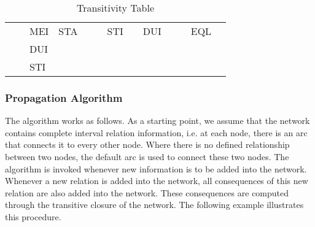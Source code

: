 \documentclass[11pt]{report}
\newenvironment{vvarmargin}[2]
{
  \begin{list}{}
  {
    \setlength{\topsep}{0pt}
    \setlength{\leftmargin}{0pt}
    \setlength{\rightmargin}{0pt}
    \setlength{\listparindent}{\parindent}
    \setlength{\itemindent}{\parindent}
    \setlength{\parsep}{0pt plus 1pt}
    \addtolength{\leftmargin}{#1}\addtolength{\rightmargin}{#2}
  }
  \item
}
{
  \end{list}
}
\begin{document}
\begin{table}[p]
\begin{vvarmargin}{-4cm}{-4cm}
\begin{center}
\begin{tabular}[t]{|r|l|l|l|l|l|l|l|l|l|l|l|l|}
                                        &                         & MEI                     & STA                     &                         &                         & STI                     &                         & DUI                     &                         &                         & EQL                     &                         \\
                                        &                         & DUI                     &                         &                         &                         &                         &                         &                         &                         &                         &                         &                         \\
                                        &                         & STI                     &                         &                         &                         &                         &                         &                         &                         &                         &                         &                         \\
                \hline
              \end{tabular}
            \end{center}
            \caption[]{Transitivity Table}
            \label{table-trans}
          \end{vvarmargin}
        \end{table}

        \subsubsection{Propagation Algorithm}

          The algorithm works as follows. As a starting point, we assume that the
          network contains complete interval relation information, i.e. at each node,
          there is an arc that connects it to every other node. Where there is no
          defined relationship between two nodes, the default arc is used to connect
          these two nodes. The algorithm is invoked whenever new information is to be
          added into the network. Whenever a new relation is added into the network,
          all consequences of this new relation are also added into the network. These
          consequences are computed through the transitive closure of the network. The
          following example illustrates this procedure.
\end{document}
